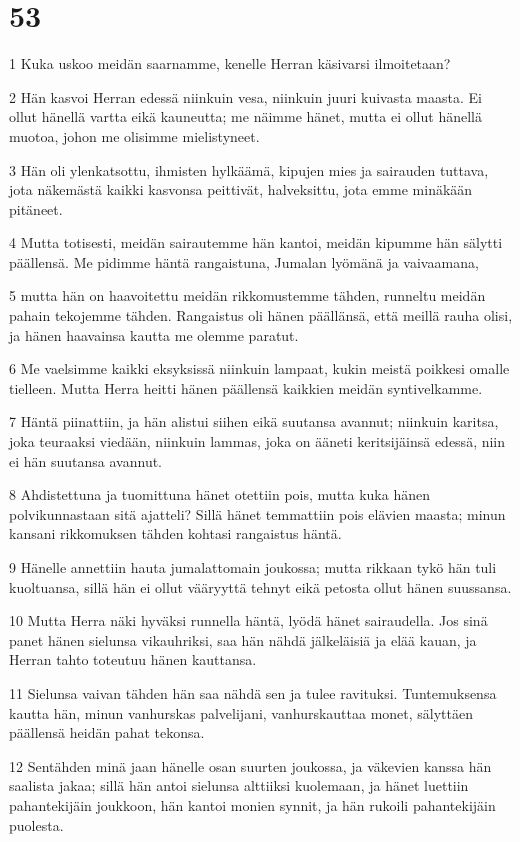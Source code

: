 \chapter{53}

\par 1 Kuka uskoo meidän saarnamme, kenelle Herran käsivarsi ilmoitetaan?
\par 2 Hän kasvoi Herran edessä niinkuin vesa, niinkuin juuri kuivasta maasta. Ei ollut hänellä vartta eikä kauneutta; me näimme hänet, mutta ei ollut hänellä muotoa, johon me olisimme mielistyneet.
\par 3 Hän oli ylenkatsottu, ihmisten hylkäämä, kipujen mies ja sairauden tuttava, jota näkemästä kaikki kasvonsa peittivät, halveksittu, jota emme minäkään pitäneet.
\par 4 Mutta totisesti, meidän sairautemme hän kantoi, meidän kipumme hän sälytti päällensä. Me pidimme häntä rangaistuna, Jumalan lyömänä ja vaivaamana,
\par 5 mutta hän on haavoitettu meidän rikkomustemme tähden, runneltu meidän pahain tekojemme tähden. Rangaistus oli hänen päällänsä, että meillä rauha olisi, ja hänen haavainsa kautta me olemme paratut.
\par 6 Me vaelsimme kaikki eksyksissä niinkuin lampaat, kukin meistä poikkesi omalle tielleen. Mutta Herra heitti hänen päällensä kaikkien meidän syntivelkamme.
\par 7 Häntä piinattiin, ja hän alistui siihen eikä suutansa avannut; niinkuin karitsa, joka teuraaksi viedään, niinkuin lammas, joka on ääneti keritsijäinsä edessä, niin ei hän suutansa avannut.
\par 8 Ahdistettuna ja tuomittuna hänet otettiin pois, mutta kuka hänen polvikunnastaan sitä ajatteli? Sillä hänet temmattiin pois elävien maasta; minun kansani rikkomuksen tähden kohtasi rangaistus häntä.
\par 9 Hänelle annettiin hauta jumalattomain joukossa; mutta rikkaan tykö hän tuli kuoltuansa, sillä hän ei ollut vääryyttä tehnyt eikä petosta ollut hänen suussansa.
\par 10 Mutta Herra näki hyväksi runnella häntä, lyödä hänet sairaudella. Jos sinä panet hänen sielunsa vikauhriksi, saa hän nähdä jälkeläisiä ja elää kauan, ja Herran tahto toteutuu hänen kauttansa.
\par 11 Sielunsa vaivan tähden hän saa nähdä sen ja tulee ravituksi. Tuntemuksensa kautta hän, minun vanhurskas palvelijani, vanhurskauttaa monet, sälyttäen päällensä heidän pahat tekonsa.
\par 12 Sentähden minä jaan hänelle osan suurten joukossa, ja väkevien kanssa hän saalista jakaa; sillä hän antoi sielunsa alttiiksi kuolemaan, ja hänet luettiin pahantekijäin joukkoon, hän kantoi monien synnit, ja hän rukoili pahantekijäin puolesta.

